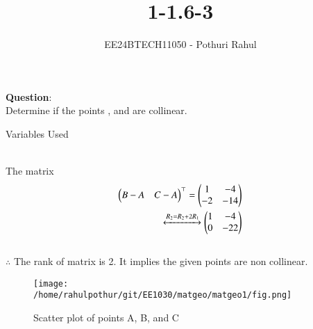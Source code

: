 \documentclass[journal]{IEEEtran}
\begin{document}

\vspace{3cm}

\title{1-1.6-3}
\author{EE24BTECH11050 - Pothuri Rahul}
{\let\newpage\relax\maketitle}

\renewcommand{\thefigure}{\theenumi}
\renewcommand{\thetable}{\theenumi}
\setlength{\intextsep}{10pt} %


\renewcommand{\thetable}{\theenumi}
\textbf{Question}:\\
Determine if the points  ,  and  are collinear. \\
\solution 
\begin{table}[h!]
    \centering
    
    \caption{Variables Used}
    \label{tab:1.6-3}
\end{table}
\\

The matrix
\begin{align}
\begin{pmatrix}B-A & C-A\end{pmatrix}^\top=\begin{pmatrix}1 & -4 \\ -2 & -14\end{pmatrix}\\
\xleftrightarrow{R_2 =R_2 +2R_1} 
\begin{pmatrix}1 & -4 \\ 0 & -22 \end{pmatrix}
\end{align}
\\
$\therefore$
The rank of matrix is 2. It implies the given points are non collinear.


\begin{figure}[h!]
    \centering
    \texttt{[image: /home/rahulpothur/git/EE1030/matgeo/matgeo1/fig.png]} 
    \caption{Scatter plot of points A, B, and C}
    \label{fig:scatter_plot}
\end{figure}
\end{document}
